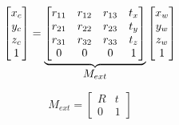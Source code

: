 \begin{equation}
    \begin{bmatrix}
        x_c \\ y_c \\ z_c \\ 1
    \end{bmatrix}
    =
    \underbrace{
        \begin{bmatrix}
            r_{11} & r_{12} & r_{13} & t_x \\
            r_{21} & r_{22} & r_{23} & t_y \\
            r_{31} & r_{32} & r_{33} & t_z \\
            0      & 0      & 0      & 1
        \end{bmatrix}
    }_{\mathlarger{M_{ext}}}
    \begin{bmatrix}
        x_w \\ y_w \\ z_w \\1
    \end{bmatrix}
\end{equation}

\begin{equation}
    M_{ext} =
    \begin{bmatrix}
        R & t \\
        0 & 1
    \end{bmatrix}
\end{equation}

